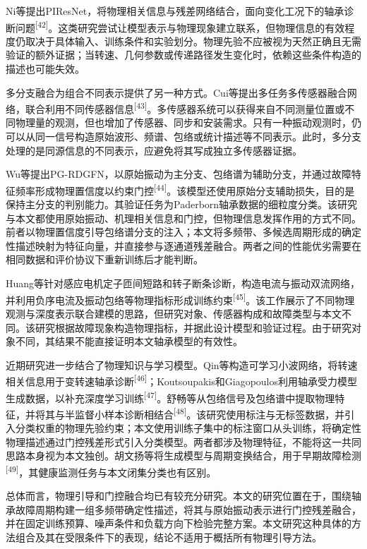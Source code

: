 \documentclass[UTF8,12pt,openany,twoside]{ctexbook}
\numberwithin{equation}{chapter}
\begin{document}
Ni等提出PIResNet，将物理相关信息与残差网络结合，面向变化工况下的轴承诊断问题\textsuperscript{[42]}。这类研究尝试让模型表示与物理现象建立联系，但物理信息的有效程度仍取决于具体输入、训练条件和实验划分。物理先验不应被视为天然正确且无需验证的额外证据；当转速、几何参数或传递路径发生变化时，依赖这些条件构造的描述也可能失效。

多分支融合为组合不同表示提供了另一种方式。Cui等提出多任务多传感器融合网络，联合利用不同传感器信息\textsuperscript{[43]}。多传感器系统可以获得来自不同测量位置或不同物理量的观测，但也增加了传感器、同步和安装需求。只有一种振动观测时，仍可以从同一信号构造原始波形、频谱、包络或统计描述等不同表示。此时，多分支处理的是同源信息的不同表示，应避免将其写成独立多传感器证据。

Wu等提出PG-RDGFN，以原始振动为主分支、包络谱为辅助分支，并通过故障特征频率形成物理置信度以约束门控\textsuperscript{[44]}。该模型还使用原始分支辅助损失，目的是保持主分支的判别能力。其验证任务为Paderborn轴承数据的细粒度分类。该研究与本文都使用原始振动、机理相关信息和门控，但物理信息发挥作用的方式不同。前者以物理置信度引导包络谱分支的注入；本文将多频带、多候选周期形成的确定性描述映射为特征向量，并直接参与逐通道残差融合。两者之间的性能优劣需要在相同数据和评价协议下重新训练后才能判断。

Huang等针对感应电机定子匝间短路和转子断条诊断，构造电流与振动双流网络，并利用负序电流及振动包络等物理指标形成训练约束\textsuperscript{[45]}。该工作展示了不同物理观测与深度表示联合建模的思路，但研究对象、传感器构成和故障类型与本文不同。该研究根据故障现象构造物理指标，并据此设计模型和验证过程。由于研究对象不同，其结果不能直接证明本文轴承模型的有效性。

近期研究进一步结合了物理知识与学习模型。Qin等构造可学习小波网络，将转速相关信息用于变转速轴承诊断\textsuperscript{[46]}；Koutsoupakis和Giagopoulos利用轴承受力模型生成数据，以补充深度学习训练\textsuperscript{[47]}。舒畅等从包络信号及包络谱中提取物理特征，并将其与半监督小样本诊断相结合\textsuperscript{[48]}。该研究使用标注与无标签数据，并引入分类权重的物理先验约束；本文使用训练子集中的标注窗口从头训练，将确定性物理描述通过门控残差形式引入分类模型。两者都涉及物理特征，不能将这一共同思路本身视为本文独创。胡文扬等将生成模型与周期变换结合，用于早期故障检测\textsuperscript{[49]}，其健康监测任务与本文闭集分类也有区别。

总体而言，物理引导和门控融合均已有较充分研究。本文的研究位置在于，围绕轴承故障周期构建一组多频带确定性描述，将其与原始振动表示进行门控残差融合，并在固定训练预算、噪声条件和负载方向下检验完整方案。本文研究这种具体的方法组合及其在受限条件下的表现，结论不适用于概括所有物理引导方法。
\end{document}
